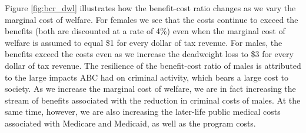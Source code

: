 \noindent Figure \ref{fig:bcr_dwl} illustrates how the benefit-cost ratio changes as we vary
the marginal cost of welfare. For females we see that the costs continue to exceed the benefits (both are discounted at a rate of 4\%) even when the marginal cost of welfare is
assumed to equal \$1 for every dollar of tax revenue. For males, the benefits
exceed the costs even as we increase the deadweight loss to \$3 for every dollar of tax
revenue. The resilience of the benefit-cost ratio of males is attributed to the 
large impacts ABC had on criminal activity, which bears a large cost to society. As we
increase the marginal cost of welfare, we are in fact increasing the stream of benefits
associated with the reduction in criminal costs of males. At the same time, however,
we are also increasing the later-life public medical costs associated with Medicare
and Medicaid, as well as the program costs. 

